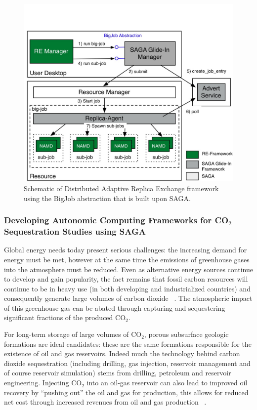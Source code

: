 \documentclass[a4paper,10pt]{article}
\begin{document}
\begin{figure}
\begin{center}
\includegraphics[scale=0.65]{DARE-MD}
\end{center}
\caption{Schematic of Distributed Adaptive Replica Exchange framework using the BigJob abstraction that is built upon SAGA.}
\label{fig:results}
\end{figure}

\subsubsection*{Developing Autonomic Computing Frameworks for CO$_2$ Sequestration Studies using SAGA}

Global energy needs today present serious challenges: the increasing demand for energy must be met, however at the same time the emissions of greenhouse gases into the atmosphere must be reduced. Even as alternative energy sources continue to develop and gain popularity, the fact remains that fossil carbon resources will continue to be in heavy use (in both developing and industrialized countries) and consequently generate large volumes of carbon dioxide ~\cite{GeoRPT}. The atmospheric impact of this greenhouse gas can be abated through capturing and sequestering significant fractions of the produced CO$_2$.

For long-term storage of large volumes of CO$_2$, porous subsurface geologic formations are ideal candidates: these are the same formations responsible for the existence of oil and gas reservoirs. Indeed much the technology behind carbon dioxide sequestration (including drilling, gas injection, reservoir management and of course reservoir simulation) stems from drilling, petroleum and reservoir engineering. Injecting CO$_2$ into an oil-gas reservoir can also lead to improved oil recovery by ``pushing out'' the oil and gas for production, this allows for reduced net cost through increased revenues from oil and gas production ~\cite{EORBook}.
\end{document}
